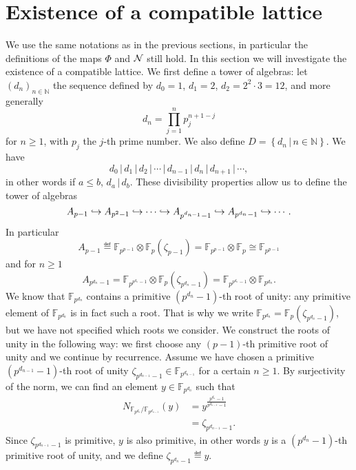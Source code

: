 \documentclass[a4paper,11pt]{article}
\begin{document}
\section{Existence of a compatible lattice}
\label{sec:existence}
We use the same notations as in the previous sections, in particular the
definitions of the maps $\Phi$ and $\mathcal N$ still hold.
In this section we will investigate the existence of a compatible lattice. We
first define a tower of algebras: let $(d_n)_{n\in\mathbb{N}}$ the sequence
defined by $d_0=1$, $d_1=2$, $d_2=2^2\cdot 3=12$, and more generally
\[
  d_n = \prod_{j=1}^n p_j^{n+1-j}
\]
for $n\geq1$, with $p_j$ the $j$-th prime number. We also define
$D=\left\{d_n\,|\,n\in\mathbb{N}\right\}$. We have 
\[
  d_0\,|\,d_1\,|\,d_2\,|\,\cdots\,|\,d_{n-1}\,|\,d_n\,|\,d_{n+1}\,|\,\cdots,
\]
in other words if $a\leq b$, $d_a\,|\,d_b$. These divisibility properties allow
us to define the tower of algebras
\[
  A_{p-1}\hookrightarrow A_{p^{2}-1}\hookrightarrow\cdots\hookrightarrow A_{p^{d_{n-1}}-1}\hookrightarrow
  A_{p^{d_n}-1}\hookrightarrow\cdots.
\]
In particular
\[
  A_{p-1}\eqdef
\mathbb{F}_{p^{p-1}}\otimes\mathbb{F}_{p}(\zeta_{p-1})=\mathbb{F}_{p^{p-1}}\otimes\mathbb{F}_p\cong\mathbb{F}_{p^{p-1}}
\]
and for $n\geq1$
\[
  A_{p^{d_n}-1}=\mathbb{F}_{p^{p^{d_n}-1}}\otimes\mathbb{F}_p(\zeta_{p^{d_n}-1})=\mathbb{F}_{p^{p^{d_n}-1}}\otimes\mathbb{F}_{p^{d_n}}.
\]
We know that $\mathbb{F}_{p^{d_n}}$ contains a primitive $(p^{d_n}-1)$-th root
of unity: any primitive element of $\mathbb{F}_{p^{d_n}}$ is in fact such a
root. That is why we write
$\mathbb{F}_{p^{d_n}}=\mathbb{F}_{p}(\zeta_{p^{d_n}-1})$, but we have not
specified which roots we consider.
We construct the roots of unity in the following way: we first choose any $(p-1)$-th primitive root of unity and we continue by recurrence. Assume we have
chosen a primitive $(p^{d_{n-1}}-1)$-th root of unity
$\zeta_{p^{d_{n-1}}-1}\in\mathbb{F}_{p^{d_{n-1}}}$
for a certain $n\geq1$. By surjectivity of the norm, we can find an element
$y\in\mathbb{F}_{p^{d_n}}$ such that
\begin{align*}
  N_{\mathbb{F}_{p^{d_n}}/\mathbb{F}_{p^{d_{n-1}}}}(y)&=y^{\frac{p^{d_n}-1}{p^{d_{n-1}}-1}}\\
  &=\zeta_{p^{d_{n-1}}-1}.
\end{align*}
Since $\zeta_{p^{d_{n-1}}-1}$ is primitive, $y$ is also primitive, in other
words $y$ is a $(p^{d_n}-1)$-th primitive root of unity, and we define
$\zeta_{p^{d_n}-1}\eqdef y$.
\end{document}

